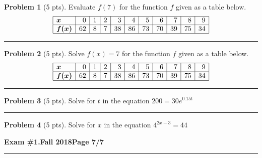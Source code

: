 \documentclass[12pt]{article}
\theoremstyle{definition}
\newtheorem{problem}{Problem}
\begin{document}
\begin{problem}[5 pts]
  Evaluate $f(7)$ for the function $f$ given as a table below.
  \begin{equation*}
    \begin{array}{|l|r|r|r|r|r|r|r|r|r|r|}
      \hline
      \boldsymbol{x} & 0 & 1 & 2 & 3 & 4 & 5 & 6 & 7 & 8 & 9 \\ \hline
      \boldsymbol{f(x)} & 62 & 8 & 7 & 38 & 86 & 73 & 70 & 39 & 75 & 34 \\ \hline
    \end{array}
  \end{equation*}

  \vspace{1cm}
\end{problem}
\hrule

\begin{problem}[5 pts]
  Solve $f(x)=7$ for the function $f$ given as a table below.
  \begin{equation*}
    \begin{array}{|l|r|r|r|r|r|r|r|r|r|r|}
      \hline
      \boldsymbol{x} & 0 & 1 & 2 & 3 & 4 & 5 & 6 & 7 & 8 & 9 \\ \hline
      \boldsymbol{f(x)} & 62 & 8 & 7 & 38 & 86 & 73 & 70 & 39 & 75 & 34 \\ \hline
    \end{array}
  \end{equation*}

  \vspace{1cm}
\end{problem}
\hrule

\begin{problem}[5 pts]
  Solve for $t$ in the equation $200 = 30e^{0.15t}$

  \vspace{4cm}
\end{problem}
\hrule

\begin{problem}[5 pts]
  Solve for $x$ in the equation $4^{2x-3} = 44$

\end{problem}
\newpage 


\hfill{\large\bf Exam \#1.}\hfill{\large\bf  Fall 2018}\hfill{\large\bf Page 7/7}\hrule
\end{document}
